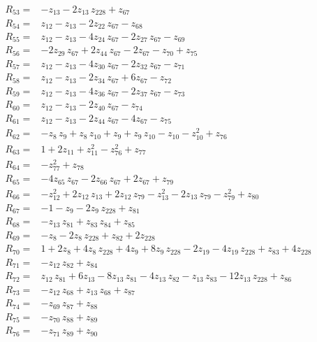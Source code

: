 \documentclass[11pt]{article}
\theoremstyle{remark}\newtheorem{remark}[theorem]{Remark}
\begin{document}
\begin{align*}
R_{53}={}& -z_{13} - 2z_{13}\,z_{228} + z_{67} \\[2pt]
R_{54}={}& z_{12} - z_{13} - 2z_{22}\,z_{67} - z_{68} \\[2pt]
R_{55}={}& z_{12} - z_{13} - 4z_{24}\,z_{67} - 2z_{27}\,z_{67} - z_{69} \\[2pt]
R_{56}={}& -2z_{29}\,z_{67} + 2z_{44}\,z_{67} - 2z_{67} - z_{70} + z_{75} \\[2pt]
R_{57}={}& z_{12} - z_{13} - 4z_{30}\,z_{67} - 2z_{32}\,z_{67} - z_{71} \\[2pt]
R_{58}={}& z_{12} - z_{13} - 2z_{34}\,z_{67} + 6z_{67} - z_{72} \\[2pt]
R_{59}={}& z_{12} - z_{13} - 4z_{36}\,z_{67} - 2z_{37}\,z_{67} - z_{73} \\[2pt]
R_{60}={}& z_{12} - z_{13} - 2z_{40}\,z_{67} - z_{74} \\[2pt]
R_{61}={}& z_{12} - z_{13} - 2z_{44}\,z_{67} - 4z_{67} - z_{75} \\[2pt]
R_{62}={}& -z_{8}\,z_{9} + z_{8}\,z_{10} + z_{9} + z_{9}\,z_{10} - z_{10} - z_{10}^{2} + z_{76} \\[2pt]
R_{63}={}& 1 + 2z_{11} + z_{11}^{2} - z_{76}^{2} + z_{77} \\[2pt]
R_{64}={}& -z_{77}^{2} + z_{78} \\[2pt]
R_{65}={}& -4z_{65}\,z_{67} - 2z_{66}\,z_{67} + 2z_{67} + z_{79} \\[2pt]
R_{66}={}& -z_{12}^{2} + 2z_{12}\,z_{13} + 2z_{12}\,z_{79} - z_{13}^{2} - 2z_{13}\,z_{79} - z_{79}^{2} + z_{80} \\[2pt]
R_{67}={}& -1 - z_{9} - 2z_{9}\,z_{228} + z_{81} \\[2pt]
R_{68}={}& -z_{13}\,z_{81} + z_{83}\,z_{84} + z_{85} \\[2pt]
R_{69}={}& -z_{8} - 2z_{8}\,z_{228} + z_{82} + 2z_{228} \\[2pt]
R_{70}={}& 1 + 2z_{8} + 4z_{8}\,z_{228} + 4z_{9} + 8z_{9}\,z_{228} - 2z_{19} - 4z_{19}\,z_{228} + z_{83} + 4z_{228} \\[2pt]
R_{71}={}& -z_{12}\,z_{82} + z_{84} \\[2pt]
R_{72}={}& z_{12}\,z_{81} + 6z_{13} - 8z_{13}\,z_{81} - 4z_{13}\,z_{82} - z_{13}\,z_{83} - 12z_{13}\,z_{228} + z_{86} \\[2pt]
R_{73}={}& -z_{12}\,z_{68} + z_{13}\,z_{68} + z_{87} \\[2pt]
R_{74}={}& -z_{69}\,z_{87} + z_{88} \\[2pt]
R_{75}={}& -z_{70}\,z_{88} + z_{89} \\[2pt]
R_{76}={}& -z_{71}\,z_{89} + z_{90} \\[2pt]

\end{align*}
\end{document}
